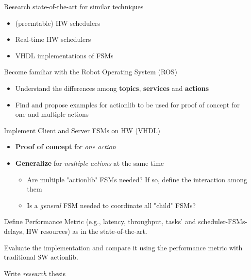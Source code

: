 \documentclass[ngerman]{tudscrreprt}	%
\begin{document}
{	%
	}{%
		\item Research state-of-the-art for similar techniques
        \begin{itemize}
            \item (preemtable) HW schedulers
            \item  Real-time HW schedulers
            \item VHDL implementations of FSMs 
        \end{itemize}
		\item Become familiar with the Robot Operating System (ROS)
        \begin{itemize}
            \item Understand the differences among \textbf{topics}, \textbf{services} and \textbf{actions}
            \item Find and propose examples for actionlib to be used for proof of concept for one and multiple actions
        \end{itemize}
		\item Implement Client and Server FSMs on HW (VHDL)
        \begin{itemize}
            \item \textbf{Proof of concept} for \textit{one action}
            \item \textbf{Generalize} for \textit{multiple actions} at the same time
            \begin{itemize}
                \item Are multiple "actionlib" FSMs needed? If so, define the interaction among them
                \item Is a \textit{general} FSM needed to coordinate all "child" FSMs?
            \end{itemize}
        \end{itemize}
		\item Define Performance Metric (e.g., latency, throughput, tasks' and scheduler-FSMs- delays, HW resources) as in the state-of-the-art.
		\item Evaluate the implementation and compare it using the performance metric with traditional SW actionlib.
        \item Write \textit{research} thesis
	}
	
\end{document}
